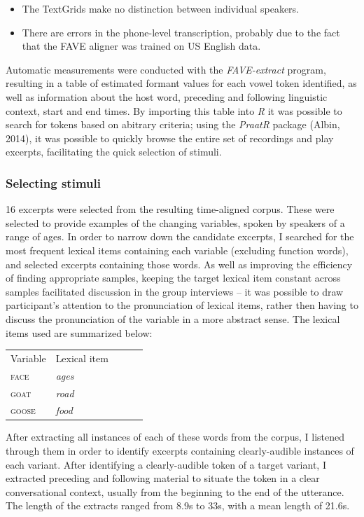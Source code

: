 \documentclass{article}
\begin{document}
\begin{itemize}
\item{The TextGrids make no distinction between individual speakers.}
\item{There are errors in the phone-level transcription, probably due to the fact that the FAVE aligner was trained on US English data.}
\end{itemize}

Automatic measurements were conducted with the \textit{FAVE-extract} program, resulting in a table of estimated formant values for each vowel token identified, as well as information about the host word, preceding and following linguistic context, start and end times. By importing this table into \textit{R} it was possible to search for tokens based on abitrary criteria; using the \textit{PraatR} package (Albin, 2014), it was possible to quickly browse the entire set of recordings and play excerpts, facilitating the quick selection of stimuli.

\subsubsection*{Selecting stimuli}
 16 excerpts were selected from the resulting time-aligned corpus. These were selected to provide examples of the changing variables, spoken by speakers of a range of ages. In order to narrow down the candidate excerpts, I searched for the most frequent lexical items containing each variable (excluding function words), and selected excerpts containing those words. As well as improving the efficiency of finding appropriate samples, keeping the target lexical item constant across samples facilitated discussion in the group interviews -- it was possible to draw participant's attention to the pronunciation of lexical items, rather then having to discuss the pronunciation of the variable in a more abstract sense. The lexical items used are summarized below:

\begin{table}[h]
\centering
\begin{tabular}{|l|l|lll}
\cline{1-2}
Variable & Lexical item                  &  &  &  \\ \cline{1-2}
\textsc{face}     & \textit{ages}                       &  &  &  \\ \cline{1-2}
\textsc{goat}     & \textit{road}                        &  &  &  \\ \cline{1-2}
\textsc{goose}    & \textit{food}                       &  &  &  \\ \cline{1-2}
\end{tabular}
\end{table}
After extracting all instances of each of these words from the corpus, I listened through them in order to identify excerpts containing clearly-audible instances of each variant. After identifying a clearly-audible token of a target variant, I extracted preceding and following material to situate the token in a clear conversational context, usually from the beginning to the end of the utterance. The length of the extracts ranged from 8.9s to 33s, with a mean length of 21.6s. 
\end{document}
